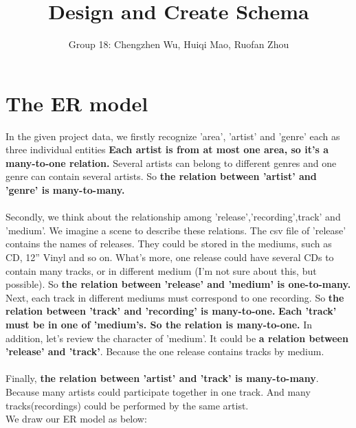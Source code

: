 \documentclass[11pt]{article} %
\title{Design and Create Schema}
\author{Group 18: Chengzhen Wu, Huiqi Mao, Ruofan Zhou}
\begin{document}
\maketitle

\section{The ER model}
In the given project data, we firstly recognize 'area', 'artist' and 'genre' each as three individual entities \textbf{Each artist is from at most one area, so it's a many-to-one relation.} Several artists can belong to different genres and one genre can contain several artists. So \textbf{the relation between 'artist' and 'genre' is many-to-many. }\\ \\
Secondly, we  think about the relationship among 'release','recording',track' and 'medium'. We imagine a scene to describe these relations. The csv file of 'release' contains the names of releases. They could be stored in the mediums, such as CD, 12'' Vinyl and so on. What's more, one release could have several CDs to contain many tracks, or in different medium (I'm not sure about this, but possible).  So \textbf{the relation between 'release' and 'medium' is one-to-many.} Next, each track in different mediums must correspond to one recording. So \textbf{the relation between 'track' and 'recording' is many-to-one.}  \textbf{Each 'track' must be in one of  'medium's. So the relation is many-to-one.} In addition, let's review the character of 'medium'. It could be \textbf{a relation between 'release' and 'track'}. Because the one release contains tracks by medium. \\ \\

Finally, \textbf{the relation between 'artist' and 'track' is many-to-many}. Because many artists could participate together in one track. And many tracks(recordings) could be performed by the same artist.\\


We draw our ER model as below:
\\
\\
\end{document}

